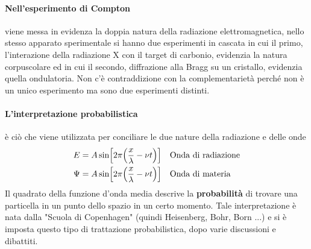 \paragraph{Nell'esperimento di Compton} viene messa in evidenza la doppia natura della radiazione elettromagnetica, nello stesso apparato sperimentale si hanno due esperimenti in cascata in cui il primo, l'interazione della radiazione X con il target di carbonio, evidenzia la natura corpuscolare ed in cui il secondo, diffrazione alla Bragg su un cristallo, evidenzia quella ondulatoria.
Non c'è contraddizione con la complementarietà perché non è un unico esperimento ma sono due esperimenti distinti.

\paragraph{L'interpretazione probabilistica} è ciò che viene utilizzata per conciliare le due nature della radiazione e delle onde
\begin{equation}
\begin{split}
E & = A \sin \Bigl[ 2\pi \Bigl(  \frac{ x}{\lambda } - \nu t  \Bigr) \Bigr] \quad \mbox{Onda di radiazione} \\
\Psi & = A \sin \Bigl[ 2\pi \Bigl(  \frac{ x}{\lambda } - \nu t  \Bigr) \Bigr] \quad \mbox{Onda di materia}
\end{split}
\end{equation}
Il quadrato della funzione d'onda media descrive la \textbf{probabilità} di trovare una particella in un punto dello spazio in un certo momento.
Tale interpretazione è nata dalla "Scuola di Copenhagen" (quindi Heisenberg, Bohr, Born ...)
e si è imposta questo tipo di trattazione probabilistica, dopo varie discussioni e dibattiti.

